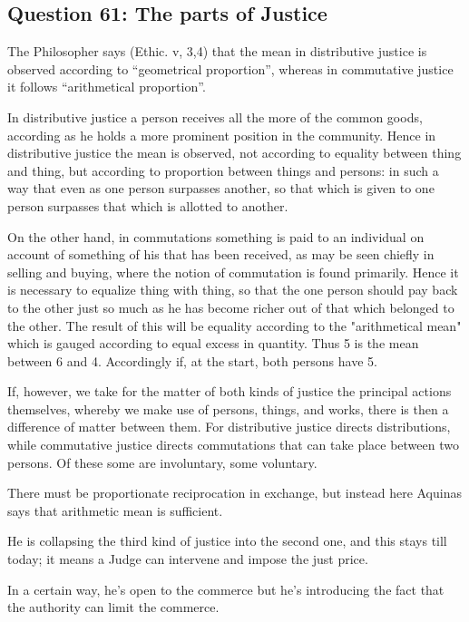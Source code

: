         \subsection{Question 61: The parts of Justice}

            The Philosopher says (Ethic. v, 3,4) that the mean in distributive justice is observed according to ``geometrical proportion'', whereas in commutative justice it follows “arithmetical proportion”.
                
            In distributive justice a person receives all the more of the common goods, according as he holds a more prominent position in the community. Hence in distributive justice the mean is observed, not according to equality between thing and thing, but according to proportion between things and persons: in such a way that even as one person surpasses another, so that which is given to one person surpasses that which is allotted to another.

            On the other hand, in commutations something is paid to an individual on account of something of his that has been received, as may be seen chiefly in selling and buying, where the notion of commutation is found primarily. Hence it is necessary to equalize thing with thing, so that the one person should pay back to the other just so much as he has become richer out of that which belonged to the other. The result of this will be equality according to the "arithmetical mean" which is gauged according to equal excess in quantity. Thus 5 is the mean between 6 and 4. Accordingly if, at the start, both persons have 5.

            If, however, we take for the matter of both kinds of justice the principal actions themselves, whereby we make use of persons, things, and works, there is then a difference of matter between them. For distributive justice directs distributions, while commutative justice directs commutations that can take place between two persons. Of these some are involuntary, some voluntary.

            \begin{remark}
                There must be proportionate reciprocation in exchange, but instead here Aquinas says that arithmetic mean is sufficient.

                He  is collapsing the third kind of justice into the second one, and this stays till today; it means a Judge can intervene and impose the just price.

                In a certain way, he's open to the commerce but he's introducing the fact that the authority can limit the commerce.
            \end{remark}

